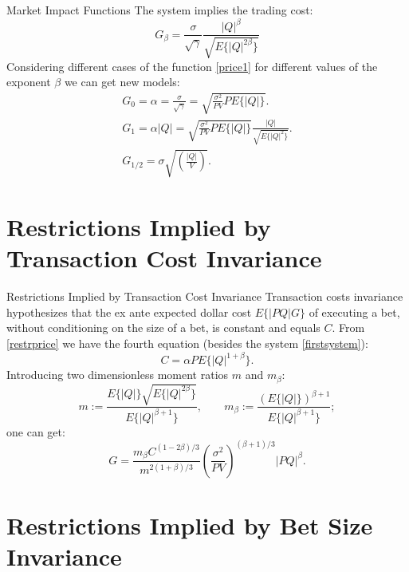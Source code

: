 \documentclass[aspectratio=169]{beamer}
\begin{document}
\begin{frame}{Market Impact Functions}
    The system implies the trading cost:
    \begin{equation} \label{price1}
        G_{\beta} = \frac{\sigma}{\sqrt{\gamma}} \frac{|Q|^\beta}{\sqrt{E\{ |Q|^{2\beta}\}}}
    \end{equation}
    Considering different cases of the function \ref{price1} for different values of the exponent $\beta$
    we can get new models:
    \begin{align*}
        G_0 = \alpha = \frac{\sigma}{\sqrt{\gamma}} = \sqrt{\frac{\sigma^2}{P V} P E\{|Q|\}}.    \\
        G_1 = \alpha |Q| = \sqrt{\frac{\sigma^2}{P V} P E\{|Q|\}} \frac{|Q|}{\sqrt{E\{|Q|^2\}}}. \\
        G_{1/2} = \sigma \sqrt{\left(\frac{|Q|}{V}\right)}.
    \end{align*}
\end{frame}

\section{Restrictions Implied by Transaction Cost Invariance}

\begin{frame}{Restrictions Implied by Transaction Cost Invariance}
    Transaction costs invariance hypothesizes that the ex ante expected dollar cost $E\{|P Q| G\}$ of
    executing a bet, without conditioning on the size of a bet, is constant and equals $C$. From \ref{restrprice}
    we have the fourth equation (besides the system \ref{firstsystem}):
    \begin{equation*}
        C = \alpha P E\{|Q|^{1 + \beta}\}.
    \end{equation*}
    Introducing two dimensionless moment ratios $m$ and $m_\beta$:
    \begin{equation*}
        m := \frac{E\{|Q|\} \sqrt{E\{|Q|^{2 \beta}\}}}{E\{|Q|^{\beta + 1}\}}, \; \; \; \; \; \; \; m_\beta := \frac{(E\{|Q|\})^{\beta + 1}}{E\{|Q|^{\beta + 1}\}};
    \end{equation*}
    one can get:
    \begin{equation*}
        G = \frac{m_\beta C ^{(1- 2 \beta) / 3}}{m ^{2(1 + \beta) / 3}}  \left( \frac{\sigma^2}{PV} \right) ^{(\beta + 1) / 3} |P Q|^\beta .
    \end{equation*}
\end{frame}

\section{Restrictions Implied by Bet Size Invariance}
\end{document}
